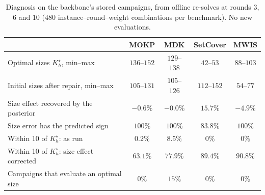 \begin{table}[t]\centering\small
\caption{Diagnosis on the backbone's stored campaigns, from offline re-solves at rounds $3$, $6$ and $10$ ($480$ instance--round--weight combinations per benchmark). No new evaluations.}
\label{tab:diagfull}
\begin{tabular}{lcccc}
\toprule
 & MOKP & MDK & SetCover & MWIS \\
\midrule
Optimal sizes $K^\star_h$, min--max             & $136$--$152$ & $129$--$138$ & $42$--$53$   & $88$--$103$ \\
Initial sizes after repair, min--max            & $105$--$131$ & $105$--$126$ & $112$--$152$ & $54$--$77$ \\
\midrule
Size effect recovered by the posterior         & $-0.6\%$ & $-0.0\%$ & $15.7\%$ & $-4.9\%$ \\
Size error has the predicted sign              & $100\%$  & $100\%$  & $83.8\%$ & $100\%$ \\
\midrule
Within 10 of $K^\star_h$: as run               & $0.2\%$  & $8.5\%$  & $0\%$    & $0\%$ \\
Within 10 of $K^\star_h$: size effect corrected& $\mathbf{63.1\%}$ & $\mathbf{77.9\%}$ & $\mathbf{89.4\%}$ & $\mathbf{90.8\%}$ \\
\midrule
Campaigns that evaluate an optimal size        & $0\%$    & $15\%$   & $0\%$    & $0\%$ \\
\bottomrule
\end{tabular}
\end{table}
